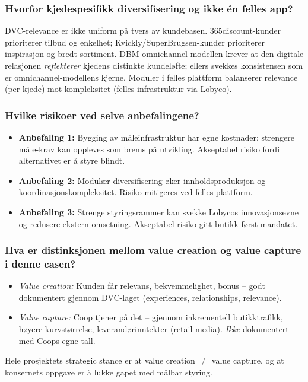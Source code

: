 \subsubsection*{\guillemotleft{}Hvorfor kjedespesifikk diversifisering og ikke én felles
app?\guillemotright{}}
DVC-relevance er ikke uniform på tvers av kundebasen. 365discount-kunder
prioriterer tilbud og enkelhet; Kvickly/SuperBrugsen-kunder prioriterer
inspirasjon og bredt sortiment. DBM-omnichannel-modellen krever at den
digitale relasjonen \emph{reflekterer} kjedens distinkte kundeløfte; ellers
svekkes konsistensen som er omnichannel-modellens kjerne. Moduler i felles
plattform balanserer relevance (per kjede) mot kompleksitet (felles
infrastruktur via Lobyco).

\subsubsection*{\guillemotleft{}Hvilke risikoer ved selve anbefalingene?\guillemotright{}}
\begin{itemize}
  \item \textbf{Anbefaling 1:} Bygging av måleinfrastruktur har egne
    kostnader; strengere måle-krav kan oppleves som brems på utvikling.
    Akseptabel risiko fordi alternativet er å styre blindt.
  \item \textbf{Anbefaling 2:} Modulær diversifisering øker
    innholdsproduksjon og koordinasjonskompleksitet. Risiko mitigeres ved
    felles plattform.
  \item \textbf{Anbefaling 3:} Strenge styringsrammer kan svekke Lobycos
    innovasjonsevne og redusere ekstern omsetning. Akseptabel risiko gitt
    butikk-først-mandatet.
\end{itemize}

\subsubsection*{\guillemotleft{}Hva er distinksjonen mellom value creation og value
capture i denne casen?\guillemotright{}}
\begin{itemize}
  \item \emph{Value creation:} Kunden får relevans, bekvemmelighet, bonus
    -- godt dokumentert gjennom DVC-laget (experiences, relationships,
    relevance).
  \item \emph{Value capture:} Coop tjener på det -- gjennom inkrementell
    butikktrafikk, høyere kurvstørrelse, leverandørinntekter (retail
    media). \emph{Ikke} dokumentert med Coops egne tall.
\end{itemize}
Hele prosjektets \guillemotleft{}strategic stance\guillemotright{} er at value creation $\neq$ value
capture, og at konsernets oppgave er å lukke gapet med målbar styring.

